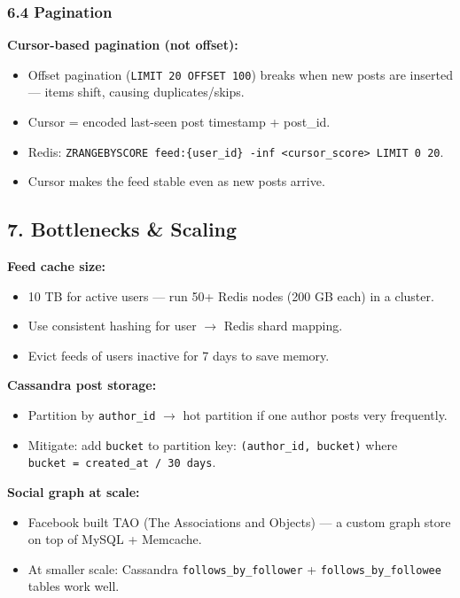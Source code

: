 \documentclass[11pt]{article}
\providecommand{\tightlist}{\setlength{\itemsep}{1pt}\setlength{\parskip}{0pt}}
\begin{document}
\subsubsection{6.4 Pagination}\label{64-pagination}

\textbf{Cursor-based pagination (not offset):}

\begin{itemize}
\tightlist
\item
  Offset pagination (\texttt{LIMIT\ 20\ OFFSET\ 100}) breaks when new posts are inserted --- items shift, causing duplicates/skips.
\item
  Cursor = encoded last-seen post timestamp + post\_id.
\item
  Redis: \texttt{ZRANGEBYSCORE\ feed:\{user\_id\}\ -inf\ \textless{}cursor\_score\textgreater{}\ LIMIT\ 0\ 20}.
\item
  Cursor makes the feed stable even as new posts arrive.
\end{itemize}

\subsection{7. Bottlenecks \& Scaling}\label{7-bottlenecks--scaling-2}

\textbf{Feed cache size:}

\begin{itemize}
\tightlist
\item
  10 TB for active users --- run 50+ Redis nodes (200 GB each) in a cluster.
\item
  Use consistent hashing for user \(\rightarrow\) Redis shard mapping.
\item
  Evict feeds of users inactive for 7 days to save memory.
\end{itemize}

\textbf{Cassandra post storage:}

\begin{itemize}
\tightlist
\item
  Partition by \texttt{author\_id} \(\rightarrow\) hot partition if one author posts very frequently.
\item
  Mitigate: add \texttt{bucket} to partition key: \texttt{(author\_id,\ bucket)} where \texttt{bucket\ =\ created\_at\ /\ 30\ days}.
\end{itemize}

\textbf{Social graph at scale:}

\begin{itemize}
\tightlist
\item
  Facebook built TAO (The Associations and Objects) --- a custom graph store on top of MySQL + Memcache.
\item
  At smaller scale: Cassandra \texttt{follows\_by\_follower} + \texttt{follows\_by\_followee} tables work well.
\end{itemize}
\end{document}

